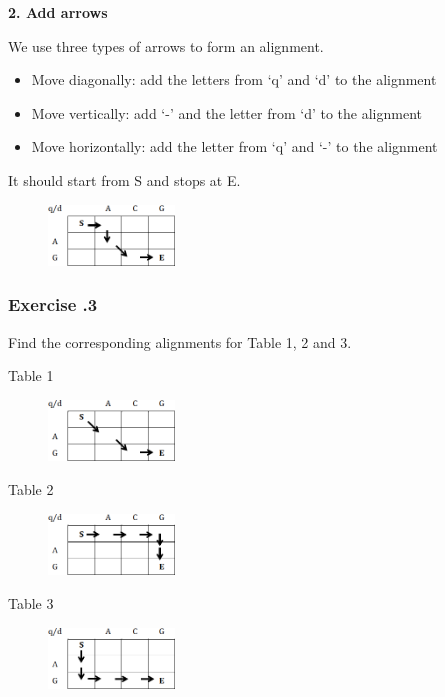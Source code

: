 \noindent \textbf{2. Add arrows}

We use three types of arrows to form an alignment.
\begin{itemize}
\item Move diagonally: add the letters from ‘q’ and ‘d’ to the alignment
\item Move vertically: add ‘-’ and the letter from ‘d’ to the alignment
\item Move horizontally: add the letter from ‘q’ and ‘-’ to the alignment
\end{itemize}

It should start from S and stops at E.

\begin{figure}[H]
  \centering
      \includegraphics[width=0.3\textwidth]{fig02/alignment_to_table_example.png}
\end{figure}

%
%
\subsubsection*{Exercise \thesection.3}

Find the corresponding alignments for Table 1, 2 and 3.

\begin{multicols}{3}
Table 1
\begin{figure}[H]
  \centering
      \includegraphics[width=0.3\textwidth]{fig02/alignment_to_table_exercise1.png}
\end{figure}

Table 2
\begin{figure}[H]
  \centering
      \includegraphics[width=0.3\textwidth]{fig02/alignment_to_table_exercise2.png}
\end{figure}

Table 3
\begin{figure}[H]
  \centering
      \includegraphics[width=0.3\textwidth]{fig02/alignment_to_table_exercise3.png}
\end{figure}

\end{multicols} 

%
